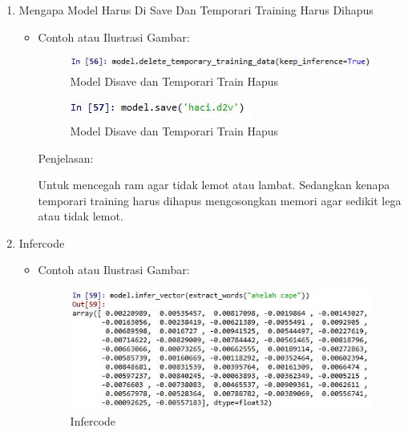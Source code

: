 \begin{enumerate}
\begin{itemize}
\end{itemize}

\item Mengapa Model Harus Di Save Dan Temporari Training Harus Dihapus
\begin{itemize}
\item Contoh atau Ilustrasi Gambar:

\begin{figure}[H]
\centering
\includegraphics[scale=0.7]{figures/1174051/5/49.jpg}
\caption{Model Disave dan Temporari Train Hapus}
\label{Model Disave dan Temporari Train Hapus}
\end{figure}

\begin{figure}[H]
\centering
\includegraphics[scale=0.7]{figures/1174051/5/50.jpg}
\caption{Model Disave dan Temporari Train Hapus}
\label{Model Disave dan Temporari Train Hapus}
\end{figure}

Penjelasan:

Untuk mencegah ram agar tidak lemot atau lambat. Sedangkan kenapa temporari training harus dihapus mengosongkan memori agar sedikit lega atau tidak lemot.

\end{itemize}

\item Infercode
\begin{itemize}
\item Contoh atau Ilustrasi Gambar:

\begin{figure}[H]
\centering
\includegraphics[scale=0.7]{figures/1174051/5/51.jpg}
\caption{Infercode}
\label{Infercode}
\end{figure}


\end{itemize}
\end{enumerate}
